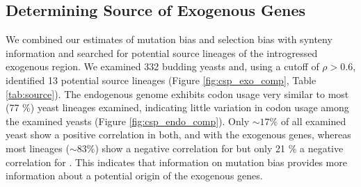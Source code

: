 \documentclass[fleqn,letterpaper]{article}
\begin{document}
\subsection*{Determining Source of Exogenous Genes}

We combined our estimates of mutation bias \DM and selection bias \DE with synteny information and searched for potential source lineages of the introgressed exogenous region.
We examined 332 budding yeasts \citep{shen2018} and, using a cutoff of $\rho > 0.6$, identified 13 potential source lineages (Figure \ref{fig:csp_exo_comp}, Table \ref{tab:source}).
The endogenous \kluyveri genome exhibits codon usage very similar to most (77 \%) yeast lineages examined, indicating little variation in codon usage among the examined yeasts (Figure \ref{fig:csp_endo_comp}).
Only $\sim 17 \%$ of all examined yeast show a positive correlation in both, \DM and \DE with the exogenous genes, whereas most lineages ($\sim 83 \%$) show a negative correlation for \DM but only 21 \% a negative correlation for \DE.
This indicates that information on mutation bias provides more information about a potential origin of the exogenous genes.
\end{document}
